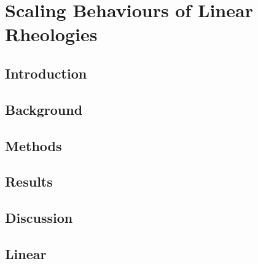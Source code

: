 \documentclass[letterpaper,10pt,english]{jupyterBook}
\begin{document}
\chapter{Scaling Behaviours of Linear Rheologies}
\label{\detokenize{content/chapter_04_linear/abstract:scaling-behaviours-of-linear-rheologies}}\label{\detokenize{content/chapter_04_linear/abstract::doc}}

\section{Introduction}
\label{\detokenize{content/chapter_04_linear/section01_introduction:introduction}}\label{\detokenize{content/chapter_04_linear/section01_introduction::doc}}

\section{Background}
\label{\detokenize{content/chapter_04_linear/section02_background:background}}\label{\detokenize{content/chapter_04_linear/section02_background::doc}}
\begin{sphinxVerbatim}[commandchars=\\\{\}]
   
\end{sphinxVerbatim}


\section{Methods}
\label{\detokenize{content/chapter_04_linear/section03_methods:methods}}\label{\detokenize{content/chapter_04_linear/section03_methods::doc}}

\section{Results}
\label{\detokenize{content/chapter_04_linear/section04_results:results}}\label{\detokenize{content/chapter_04_linear/section04_results::doc}}

\section{Discussion}
\label{\detokenize{content/chapter_04_linear/section05_discussion:discussion}}\label{\detokenize{content/chapter_04_linear/section05_discussion::doc}}

\section{Linear}
\label{\detokenize{content/chapter_04_linear/conclusion:linear}}\label{\detokenize{content/chapter_04_linear/conclusion::doc}}
\end{document}
